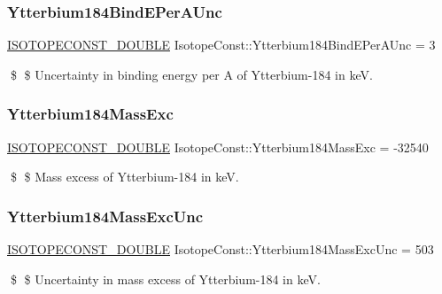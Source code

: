 \subsubsection{\texorpdfstring{Ytterbium184\+Bind\+E\+Per\+A\+Unc}{Ytterbium184BindEPerAUnc}}
{\footnotesize\ttfamily \mbox{\hyperlink{group___isotope_const-_macros_ga8f45a7272ce02c0b4c65c44636ed719a}{I\+S\+O\+T\+O\+P\+E\+C\+O\+N\+S\+T\+\_\+\+D\+O\+U\+B\+LE}} Isotope\+Const\+::\+Ytterbium184\+Bind\+E\+Per\+A\+Unc = 3}

\$ \$ Uncertainty in binding energy per A of Ytterbium-\/184 in keV. \mbox{\label{group___isotope_const-_ytterbium-_yb184_gafe21f338d5e83f16045d356426fb6b8b}} 
\subsubsection{\texorpdfstring{Ytterbium184\+Mass\+Exc}{Ytterbium184MassExc}}
{\footnotesize\ttfamily \mbox{\hyperlink{group___isotope_const-_macros_ga8f45a7272ce02c0b4c65c44636ed719a}{I\+S\+O\+T\+O\+P\+E\+C\+O\+N\+S\+T\+\_\+\+D\+O\+U\+B\+LE}} Isotope\+Const\+::\+Ytterbium184\+Mass\+Exc = -\/32540}

\$ \$ Mass excess of Ytterbium-\/184 in keV. \mbox{\label{group___isotope_const-_ytterbium-_yb184_gaa60a688830080ece87a16023b8516beb}} 
\subsubsection{\texorpdfstring{Ytterbium184\+Mass\+Exc\+Unc}{Ytterbium184MassExcUnc}}
{\footnotesize\ttfamily \mbox{\hyperlink{group___isotope_const-_macros_ga8f45a7272ce02c0b4c65c44636ed719a}{I\+S\+O\+T\+O\+P\+E\+C\+O\+N\+S\+T\+\_\+\+D\+O\+U\+B\+LE}} Isotope\+Const\+::\+Ytterbium184\+Mass\+Exc\+Unc = 503}

\$ \$ Uncertainty in mass excess of Ytterbium-\/184 in keV. \mbox{\label{group___isotope_const-_ytterbium-_yb184_gac85d781e290a8338074d81993f844146}} 

